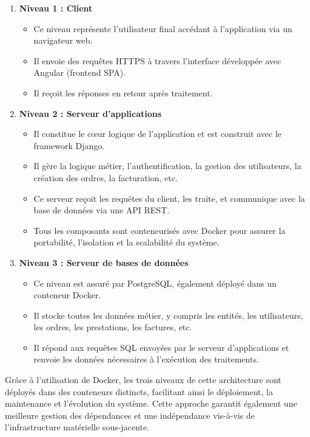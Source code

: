 \begin{enumerate}
    \item \textbf{Niveau 1 : Client}
    \begin{itemize}
        \item Ce niveau représente l’utilisateur final accédant à l’application via un navigateur web.
        \item Il envoie des requêtes HTTPS à travers l’interface développée avec Angular (frontend SPA).
        \item Il reçoit les réponses en retour après traitement.
    \end{itemize}
    
    \item \textbf{Niveau 2 : Serveur d'applications}
    \begin{itemize}
        \item Il constitue le cœur logique de l’application et est construit avec le framework Django.
        \item Il gère la logique métier, l’authentification, la gestion des utilisateurs, la création des ordres, la facturation, etc.
        \item Ce serveur reçoit les requêtes du client, les traite, et communique avec la base de données via une API REST.
        \item Tous les composants sont conteneurisés avec Docker pour assurer la portabilité, l’isolation et la scalabilité du système.
    \end{itemize}
    
    \item \textbf{Niveau 3 : Serveur de bases de données}
    \begin{itemize}
        \item Ce niveau est assuré par PostgreSQL, également déployé dans un conteneur Docker.
        \item Il stocke toutes les données métier, y compris les entités, les utilisateurs, les ordres, les prestations, les factures, etc.
        \item Il répond aux requêtes SQL envoyées par le serveur d’applications et renvoie les données nécessaires à l’exécution des traitements.
    \end{itemize}
\end{enumerate}

\medskip

Grâce à l'utilisation de Docker, les trois niveaux de cette architecture sont déployés dans des conteneurs distincts, facilitant ainsi le déploiement, la maintenance et l’évolution du système. Cette approche garantit également une meilleure gestion des dépendances et une indépendance vis-à-vis de l’infrastructure matérielle sous-jacente.

